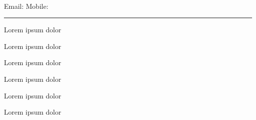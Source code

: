\documentclass[]{custom-resume}
\begin{document}
  \vspace*{0.1cm} \\
  \indent Email:
  \vsep Mobile: \\
  \noindent \textcolor{HeadingColor}{\rule{\textwidth}{1pt}}


  Lorem ipsum dolor

  Lorem ipsum dolor

  Lorem ipsum dolor

  Lorem ipsum dolor

  Lorem ipsum dolor

  Lorem ipsum dolor
\end{document}
